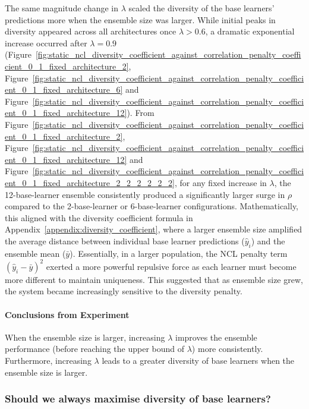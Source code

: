 \documentclass{article}
\begin{document}
The same magnitude change in $\lambda$ scaled the diversity of the base learners' predictions more when the ensemble size was larger. While initial peaks in diversity appeared across all architectures once $\lambda > 0.6$, a dramatic exponential increase occurred after $\lambda = 0.9$ (Figure~\ref{fig:static_ncl_diversity_coefficient_against_correlation_penalty_coefficient_0_1_fixed_architecture_2}, Figure~\ref{fig:static_ncl_diversity_coefficient_against_correlation_penalty_coefficient_0_1_fixed_architecture_6} and Figure~\ref{fig:static_ncl_diversity_coefficient_against_correlation_penalty_coefficient_0_1_fixed_architecture_12}). From Figure~\ref{fig:static_ncl_diversity_coefficient_against_correlation_penalty_coefficient_0_1_fixed_architecture_2}, Figure~\ref{fig:static_ncl_diversity_coefficient_against_correlation_penalty_coefficient_0_1_fixed_architecture_12} and Figure~\ref{fig:static_ncl_diversity_coefficient_against_correlation_penalty_coefficient_0_1_fixed_architecture_2_2_2_2_2_2}, for any fixed increase in $\lambda$, the 12-base-learner ensemble consistently produced a significantly larger surge in $\rho$ compared to the 2-base-learner or 6-base-learner configurations. Mathematically, this aligned with the diversity coefficient formula in Appendix~\ref{appendix:diversity_coefficient}, where a larger ensemble size amplified the average distance between individual base learner predictions ($\hat{y}_i$) and the ensemble mean ($\bar{y}$). Essentially, in a larger population, the NCL penalty term $(\hat{y}_i - \bar{y})^2$ exerted a more powerful repulsive force as each learner must become more different to maintain uniqueness. This suggested that as ensemble size grew, the system became increasingly sensitive to the diversity penalty. 

\paragraph{Conclusions from Experiment}
When the ensemble size is larger, increasing $\lambda$ improves the ensemble performance (before reaching the upper bound of $\lambda$) more consistently. Furthermore, increasing $\lambda$ leads to a greater diversity of base learners when the ensemble size is larger. 


\subsubsection{Should we always maximise diversity of base learners?}
\end{document}
